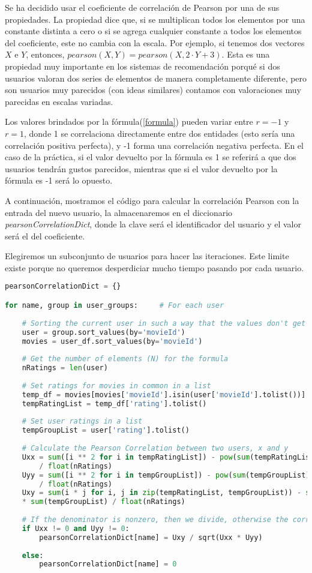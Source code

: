 \documentclass{uimppracticas}
\begin{document}
Se ha decidido usar el coeficiente de correlación de Pearson por una de sus propiedades. La propiedad dice que, si se multiplican todos los elementos por una constante distinta a cero o si se agrega cualquier constante a todos los elementos del coeficiente, este no cambia con la escala. Por ejemplo, si tenemos dos vectores $X$ e $Y$, entonces, $pearson(X,Y) = pearson(X,2\cdot Y+3)$. Esta es una propiedad muy importante en los sistemas de recomendación porqué si dos usuarios valoran dos series de elementos de manera completamente diferente, pero son usuarios muy parecidos (con ideas similares) contamos con valoraciones muy parecidas en escalas variadas.

Los valores brindados por la fórmula(\ref{formula}) pueden variar entre $r=-1$ y $r=1$, donde 1 se correlaciona directamente entre dos entidades (esto sería una correlación positiva perfecta), y -1 forma una correlación negativa perfecta. En el caso de la práctica, si el valor devuelto por la fórmula es 1 se referirá a que dos usuarios tendrán gustos parecidos, mientras que si el valor devuelto por la fórmula es -1 será lo opuesto.

A continuación, mostramos el código para calcular la correlación Pearson con la entrada del nuevo usuario, la almacenaremos en el diccionario \textit{pearsonCorrelationDict}, donde la clave será el identificador del usuario y el valor será el del coeficiente.

Elegiremos un subconjunto de usuarios para hacer las iteraciones. Este limite existe porque no queremos desperdiciar mucho tiempo pasando por cada usuario.

\begin{lstlisting}[language=python]
pearsonCorrelationDict = {}

for name, group in user_groups:     # For each user
	
	# Sorting the current user in such a way that the values don't get mixed up later
	user = group.sort_values(by='movieId')
	movies = user_df.sort_values(by='movieId')
	
	# Get the number of elements (N) for the formula
	nRatings = len(user)
	
	# Set ratings for movies in common in a list
	temp_df = movies[movies['movieId'].isin(user['movieId'].tolist())]
	tempRatingList = temp_df['rating'].tolist()
	
	# Set user ratings in a list
	tempGroupList = user['rating'].tolist()
	
	# Calculate the Pearson Correlation between two users, x and y
	Uxx = sum([i ** 2 for i in tempRatingList]) - pow(sum(tempRatingList), 2) 
		/ float(nRatings)
	Uyy = sum([i ** 2 for i in tempGroupList]) - pow(sum(tempGroupList), 2) 
		/ float(nRatings)
	Uxy = sum(i * j for i, j in zip(tempRatingList, tempGroupList)) - sum(tempRatingList)  
	* sum(tempGroupList) / float(nRatings)
	
	# If the denominator is nonzero, then we divide, otherwise the correlation is 0
	if Uxx != 0 and Uyy != 0:
		pearsonCorrelationDict[name] = Uxy / sqrt(Uxx * Uyy)
	
	else:
		pearsonCorrelationDict[name] = 0
\end{lstlisting}
\end{document}
